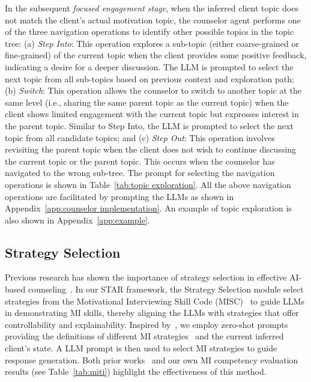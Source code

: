 In the subsequent {\em focused engagement stage}, when the inferred client topic does not match the client's actual motivation topic, the counselor agent performs one of the three navigation operations to identify other possible topics in the topic tree: (a) {\em Step Into}: This operation explores a sub-topic (either coarse-grained or fine-grained) of the current topic when the client provides some positive feedback, indicating a desire for a deeper discussion. The LLM is prompted to select the next topic from all sub-topics based on previous context and exploration path; (b) {\em Switch}: This operation allows the counselor to switch to another topic at the same level (i.e., sharing the same parent topic as the current topic) when the client shows limited engagement with the current topic but expresses interest in the parent topic. Similar to Step Into, the LLM is prompted to select the next topic from all candidate topics; and (c) {\em Step Out}: This operation involves revisiting the parent topic when the client does not wish to continue discussing the current topic or the parent topic. This occurs when the counselor has navigated to the wrong sub-tree. The prompt for selecting the navigation operations is shown in Table~\ref{tab:topic exploration}.
All the above navigation operations are facilitated by prompting the LLMs as shown in Appendix~\ref{app:counselor implementation}.  An example of topic exploration is also shown in Appendix~\ref{app:example}.

\subsection{Strategy Selection}
\label{sec: strategy selection}

Previous research has shown the importance of strategy selection in effective AI-based counseling~\citep{kang2024can,xie2024few,hsu2023helping,sun2024chain}. In our STAR framework, the Strategy Selection module select strategies from the Motivational Interviewing Skill Code (MISC)~\citep{miller2003manual} to guide LLMs in demonstrating MI skills, thereby aligning the LLMs with strategies that offer controllability and explainability. 
 Inspired by~\citet{sun2024chain}, we employ zero-shot prompts providing the definitions of different MI strategies~\citep{miller2003manual,miller2012motivational} and the current inferred client's state. A LLM prompt is then used to select MI strategies to guide response generation. 
 Both prior works~\citep{sun2024chain,xie2024few} and our own MI competency evaluation results (see Table~\ref{tab:miti}) highlight the effectiveness of this method.

